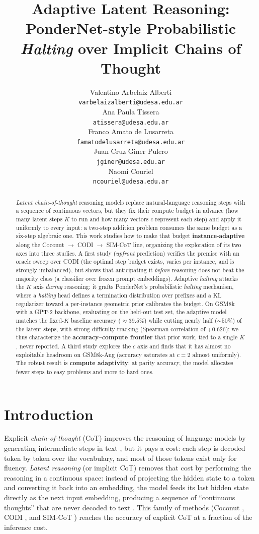 \documentclass[11pt]{article}
\title{Adaptive Latent Reasoning: PonderNet-style Probabilistic \textit{Halting} over Implicit Chains of Thought}
\author{Valentino Arbelaiz Alberti\\
  \texttt{varbelaizalberti@udesa.edu.ar} \\\And
  Ana Paula Tissera \\
  \texttt{atissera@udesa.edu.ar} \\\AND
  Franco Amato de Lusarreta \\
  \texttt{famatodelusarreta@udesa.edu.ar} \\\And
  Juan Cruz Giner Pulero \\
  \texttt{jginer@udesa.edu.ar} \\\AND
  Naomi Couriel  \\
  \texttt{ncouriel@udesa.edu.ar} \\}
\begin{document}
\maketitle

\begin{abstract}
\emph{Latent chain-of-thought} reasoning models replace natural-language reasoning steps with a sequence of continuous vectors, but they fix their compute budget in advance (how many latent steps $K$ to run and how many vectors $c$ represent each step) and apply it uniformly to every input: a two-step addition problem consumes the same budget as a six-step algebraic one. This work studies how to make that budget \textbf{instance-adaptive} along the Coconut $\rightarrow$ CODI $\rightarrow$ SIM-CoT line, organizing the exploration of its two axes into three studies. A first study (\emph{upfront} prediction) verifies the premise with an oracle sweep over CODI (the optimal step budget exists, varies per instance, and is strongly imbalanced), but shows that anticipating it \emph{before} reasoning does not beat the majority class (a classifier over frozen prompt embeddings). Adaptive \emph{halting} attacks the $K$ axis \emph{during} reasoning: it grafts PonderNet's probabilistic \textit{halting} mechanism, where a \textit{halting} head defines a termination distribution over prefixes and a KL regularizer toward a per-instance geometric prior calibrates the budget. On GSM8k with a GPT-2 backbone, evaluating on the held-out test set, the adaptive model matches the fixed-$K$ baseline accuracy ($\approx 39.5\%$) while cutting nearly half ($\sim 50\%$) of the latent steps, with strong difficulty tracking (Spearman correlation of $+0.626$); we thus characterize the \textbf{accuracy--compute frontier} that prior work, tied to a single $K$, never reported. A third study explores the $c$ axis and finds that it has almost no exploitable headroom on GSM8k-Aug (accuracy saturates at $c{=}2$ almost uniformly). The robust result is \textbf{compute adaptivity}: at parity accuracy, the model allocates fewer steps to easy problems and more to hard ones.
\end{abstract}

\section{Introduction}

Explicit \emph{chain-of-thought} (CoT) improves the reasoning of language models by generating intermediate steps in text \citep{wei2022cot}, but it pays a cost: each step is decoded token by token over the vocabulary, and most of those tokens exist only for fluency. \emph{Latent reasoning} (or implicit CoT) removes that cost by performing the reasoning in a continuous space: instead of projecting the hidden state to a token and converting it back into an embedding, the model feeds its last hidden state directly as the next input embedding, producing a sequence of ``continuous thoughts'' that are never decoded to text \citep{hao2024coconut}. This family of methods (Coconut \citep{hao2024coconut}, CODI \citep{shen2025codi}, and SIM-CoT \citep{wei2025simcot}) reaches the accuracy of explicit CoT at a fraction of the inference cost.
\end{document}
